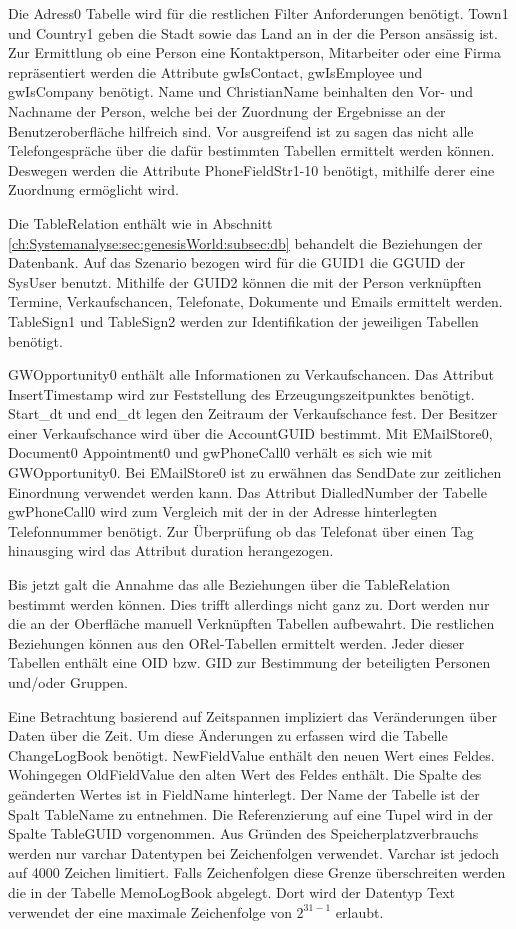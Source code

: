 Die Adress0 Tabelle wird für die restlichen Filter Anforderungen benötigt. Town1 und Country1 geben die Stadt sowie das Land an in der die Person ansässig ist. Zur Ermittlung ob eine Person eine Kontaktperson, Mitarbeiter oder eine Firma repräsentiert werden die Attribute gwIsContact, gwIsEmployee und gwIsCompany benötigt. Name und ChristianName beinhalten den Vor- und Nachname der Person, welche bei der Zuordnung der Ergebnisse an der Benutzeroberfläche hilfreich sind. Vor ausgreifend ist zu sagen das nicht alle Telefongespräche über die dafür bestimmten Tabellen ermittelt werden können. Deswegen werden die Attribute PhoneFieldStr1-10 benötigt, mithilfe derer eine Zuordnung ermöglicht wird. 

Die TableRelation enthält wie in Abschnitt \ref{ch:Systemanalyse:sec:genesisWorld:subsec:db} behandelt die Beziehungen der Datenbank. Auf das Szenario bezogen wird für die GUID1 die GGUID der SysUser benutzt. Mithilfe der GUID2 können die mit der Person verknüpften Termine, Verkaufschancen, Telefonate, Dokumente und Emails ermittelt werden. TableSign1 und TableSign2 werden zur Identifikation der jeweiligen Tabellen benötigt.

GWOpportunity0 enthält alle Informationen zu Verkaufschancen. Das Attribut InsertTimestamp wird zur Feststellung des Erzeugungszeitpunktes benötigt. Start\_dt und end\_dt legen den Zeitraum der Verkaufschance fest. Der Besitzer einer Verkaufschance wird über die AccountGUID bestimmt. Mit EMailStore0, Document0 Appointment0 und gwPhoneCall0 verhält es sich wie mit GWOpportunity0. Bei EMailStore0 ist zu erwähnen das SendDate zur zeitlichen Einordnung verwendet werden kann. Das Attribut DialledNumber der Tabelle gwPhoneCall0 wird zum Vergleich mit der in der Adresse hinterlegten Telefonnummer benötigt. Zur Überprüfung ob das Telefonat über einen Tag hinausging wird das Attribut duration herangezogen.

Bis jetzt galt die Annahme das alle Beziehungen über die TableRelation bestimmt werden können. Dies trifft allerdings nicht ganz zu. Dort werden nur die an der Oberfläche manuell Verknüpften Tabellen aufbewahrt. Die restlichen Beziehungen können aus den ORel-Tabellen ermittelt werden. Jeder dieser Tabellen enthält eine OID bzw. GID zur Bestimmung der beteiligten Personen und/oder Gruppen.

Eine Betrachtung basierend auf Zeitspannen impliziert das Veränderungen über  Daten über die Zeit. Um diese Änderungen zu erfassen wird die Tabelle ChangeLogBook benötigt. NewFieldValue enthält den neuen Wert eines Feldes. Wohingegen OldFieldValue den alten Wert des Feldes enthält. Die Spalte des geänderten Wertes ist in FieldName hinterlegt. Der Name der Tabelle ist der Spalt TableName zu entnehmen. Die Referenzierung auf eine Tupel wird in der Spalte TableGUID vorgenommen. Aus Gründen des Speicherplatzverbrauchs werden nur varchar Datentypen bei Zeichenfolgen verwendet. Varchar ist jedoch auf 4000 Zeichen limitiert. Falls Zeichenfolgen diese Grenze überschreiten werden die in der Tabelle MemoLogBook abgelegt. Dort wird der Datentyp Text verwendet der eine maximale Zeichenfolge von $2^{31-1}$  erlaubt.